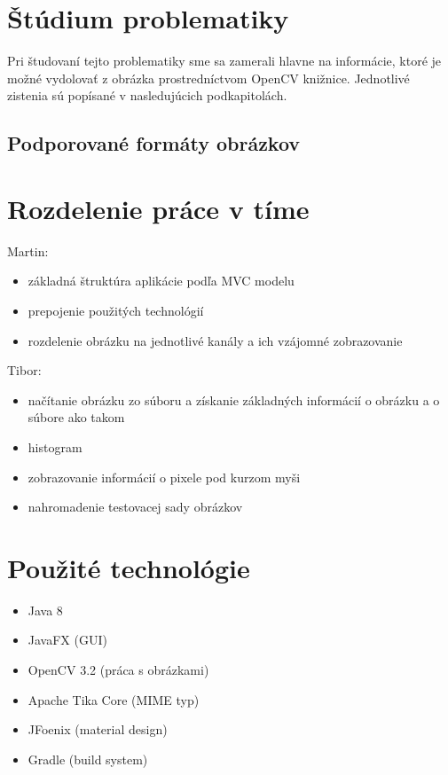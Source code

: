 \documentclass[12pt,a4paper,titlepage,final]{article}
\begin{document}
\section{Štúdium problematiky}
Pri študovaní tejto problematiky sme sa zamerali hlavne na informácie, ktoré je možné vydolovať z obrázka prostredníctvom OpenCV knižnice. Jednotlivé zistenia sú popísané v nasledujúcich podkapitolách.
\subsection{Podporované formáty obrázkov}


\section{Rozdelenie práce v tíme}
Martin:
\begin{itemize}
	\item základná štruktúra aplikácie podľa MVC modelu
	\item prepojenie použitých technológií
	\item rozdelenie obrázku na jednotlivé kanály a ich vzájomné zobrazovanie
\end{itemize}
Tibor:
\begin{itemize}
	\item načítanie obrázku zo súboru a získanie základných informácií o obrázku a o súbore ako takom
	\item histogram
	\item zobrazovanie informácií o pixele pod kurzom myši
	\item nahromadenie testovacej sady obrázkov
\end{itemize}

\section{Použité technológie}
\begin{itemize}
	\item Java 8
	\item JavaFX (GUI)
	\item OpenCV 3.2 (práca s obrázkami)
	\item Apache Tika Core (MIME typ)
	\item JFoenix (material design)
	\item Gradle (build system)
\end{itemize}
\end{document}
